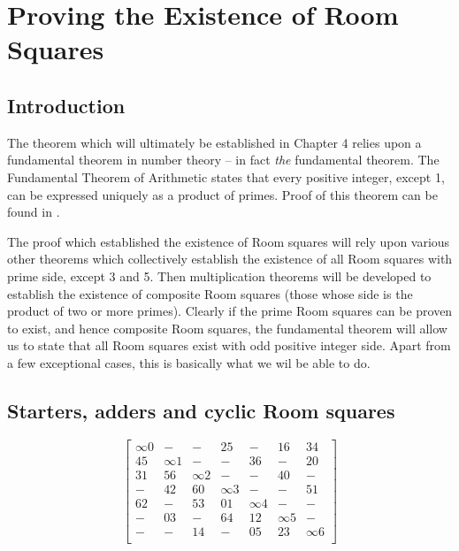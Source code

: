 \chapter{Proving the Existence of Room Squares}

\section{Introduction}

The theorem which will ultimately be established in Chapter 4 relies upon a fundamental theorem in number theory – in fact \emph{the} fundamental theorem.
The Fundamental Theorem of Arithmetic states that every positive integer, except 1, can be expressed uniquely as a product of primes.
Proof of this theorem can be found in
\cite{hardyIntroductionTheoryNumbers1979}.

The proof which established the existence of Room squares will rely upon various other theorems which collectively establish the existence of all Room squares with prime side, except 3 and 5.
Then multiplication theorems will be developed to establish the existence of composite Room squares (those whose side is the product of two or more primes).
Clearly if the prime Room squares can be proven to exist, and hence composite Room squares, the fundamental theorem will allow us to state that all Room squares exist with odd positive integer side.
Apart from a few exceptional cases, this is basically what we wil be able to do.

\section{Starters, adders and cyclic Room squares}

\begin{equation}
  \begin{bmatrix}
    \infty 0 &     -    &     -    &     25     &     -    &     16     &    34    \\
      45     & \infty 1 &     -    &      -     &    36    &      -     &    20    \\
      31     &    56    & \infty 2 &      -     &     -    &     40     &     -    \\
       -     &    42    &    60    &  \infty 3  &     -    &      -     &    51    \\
      62     &     -    &    53    &     01     & \infty 4 &      -     &     -    \\
       -     &    03    &     -    &     64     &    12    &  \infty 5  &     -    \\
       -     &     -    &    14    &      -     &    05    &     23     & \infty 6 \\
  \end{bmatrix}
  \label{eq:cyclic}
\end{equation}

